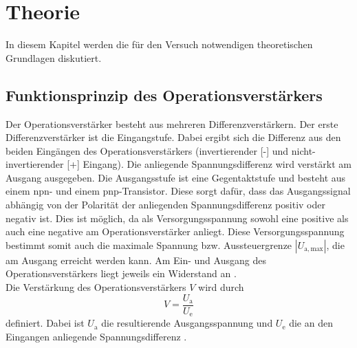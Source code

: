 \section{Theorie}
In diesem Kapitel werden die für den Versuch notwendigen theoretischen Grundlagen diskutiert. 
\subsection{Funktionsprinzip des Operationsverstärkers}
\label{sec:Theorie}
Der Operationsverstärker besteht aus mehreren Differenzverstärkern. 
Der erste Differenzverstärker ist die Eingangstufe.
Dabei ergibt sich die Differenz aus den beiden Eingängen des Operationsverstärkers (invertierender [-] und nicht-invertierender [+] Eingang). %
Die anliegende Spannungsdifferenz wird verstärkt am Ausgang ausgegeben. 
Die Ausgangsstufe ist eine Gegentaktstufe und besteht aus einem npn- und einem pnp-Transistor. %
Diese sorgt dafür, dass das Ausgangssignal abhängig von der Polarität der anliegenden Spannungsdifferenz positiv oder negativ ist.
Dies ist möglich, da als Versorgungsspannung sowohl eine positive als auch eine negative am Operationsverstärker anliegt.
Diese Versorgungsspannung bestimmt somit auch die maximale Spannung bzw. Aussteuergrenze $\left| U_{\mathrm{a,max}}\right|$, die am Ausgang erreicht werden kann. 
Am Ein- und Ausgang des Operationsverstärkers liegt jeweils ein Widerstand an \cite[2 f.]{federau_2017}.
\\
Die Verstärkung des Operationsverstärkers $V$ wird durch
\begin{equation}
    V = \frac{U_{\mathrm{a}}}{U_{\mathrm{e}}}
    \label{eqn:verstaerkung}
\end{equation}
definiert. 
Dabei ist $ U_{\mathrm{a}}$ die resultierende Ausgangsspannung und $U_{\mathrm{e}}$ die an den Eingangen anliegende Spannungsdifferenz \cite[108]{haas_2022}.


